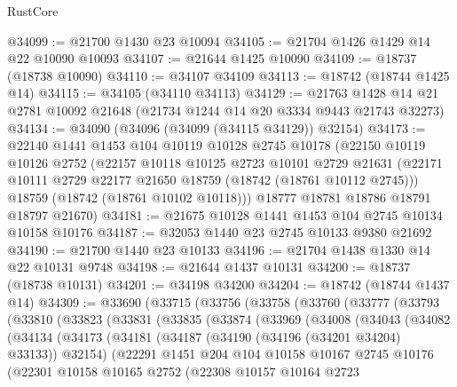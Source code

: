 \begin{lexlean}{RustCore}
\begin{coremodule}
@34099 := @21700 @1430 @23 @10094
@34105 := @21704 @1426 @1429 @14 @22 @10090 @10093
@34107 := @21644 @1425 @10090
@34109 := @18737 (@18738 @10090)
@34110 := @34107 @34109
@34113 := @18742 (@18744 @1425 @14)
@34115 := @34105 (@34110 @34113)
@34129 := @21763 @1428 @14 @21 @2781 @10092 @21648 (@21734 @1244 @14 @20 @3334 @9443 @21743 @32273)
@34134 := @34090 (@34096 (@34099 (@34115 @34129)) @32154)
@34173 := @22140
    @1441
    @1453
    @104
    @10119
    @10128
    @2745
    @10178
    (@22150
      @10119
      @10126
      @2752
      (@22157
        @10118
        @10125
        @2723
        @10101
        @2729
        @21631
        (@22171 @10111 @2729 @22177 @21650 @18759 (@18742 (@18761 @10112 @2745)))
        @18759
        (@18742 (@18761 @10102 @10118)))
      @18777
      @18781
      @18786
      @18791
      @18797
      @21670)
@34181 := @21675 @10128 @1441 @1453 @104 @2745 @10134 @10158 @10176
@34187 := @32053 @1440 @23 @2745 @10133 @9380 @21692
@34190 := @21700 @1440 @23 @10133
@34196 := @21704 @1438 @1330 @14 @22 @10131 @9748
@34198 := @21644 @1437 @10131
@34200 := @18737 (@18738 @10131)
@34201 := @34198 @34200
@34204 := @18742 (@18744 @1437 @14)
@34309 := @33690
    (@33715
      (@33756
        (@33758
          (@33760
            (@33777
              (@33793
                (@33810
                  (@33823
                    (@33831
                      (@33835
                        (@33874
                          (@33969
                            (@34008
                              (@34043
                                (@34082
                                  (@34134
                                    (@34173
                                      (@34181
                                        (@34187 (@34190 (@34196 (@34201 @34204) @33133)) @32154)
                                        (@22291
                                          @1451
                                          @204
                                          @104
                                          @10158
                                          @10167
                                          @2745
                                          @10176
                                          (@22301
                                            @10158
                                            @10165
                                            @2752
                                            (@22308
                                              @10157
                                              @10164
                                              @2723

\end{coremodule}
\end{lexlean}
